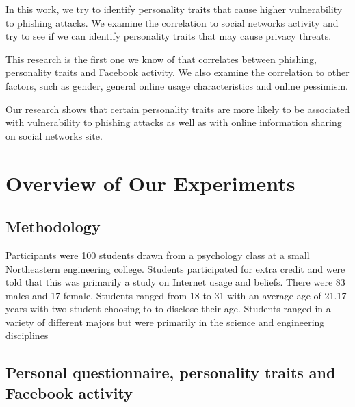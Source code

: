 \documentclass{sig-alternate}
\begin{document}
In this work, we try to identify personality traits that cause higher vulnerability to phishing attacks. We examine the correlation to social networks activity and try to see if we can identify personality traits that may cause privacy threats.

This research is the first one we know of that correlates between phishing, personality traits and Facebook activity. We also examine the correlation to other factors, such as gender, general online usage characteristics and online pessimism.

Our research shows that certain personality traits are more likely to be associated with vulnerability to phishing attacks as well as with online information sharing on social networks site.

\smallskip





















 




\section{Overview of Our Experiments}
\label{sec:setup}


\subsection{Methodology}

Participants were 100 students drawn from a psychology class at a small Northeastern engineering college. Students participated for extra credit and were told that this was primarily a study on Internet usage and beliefs. 
There were 83 males and 17 female.  
Students ranged from  18 to 31 with an average age of 21.17 years with two student choosing to to disclose their age. Students ranged in a variety of different majors but were primarily in the science and engineering disciplines



\subsection{Personal questionnaire, personality traits and Facebook activity}
\end{document}
